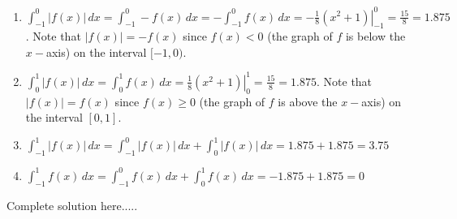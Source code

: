 \begin{example}
    \begin{sol}
    \renewcommand{\labelenumi}{\textbf{(\alph{enumi})}}
    \begin{enumerate}[leftmargin=*]
        \item $\displaystyle\int_{-1}^0 \bm{|}f(x)\bm{|}\,dx=\int_{-1}^0 -f(x)\,dx=-\int_{-1}^0 f(x)\,dx=\left.-\frac{1}{8}(x^2+1)\right|_{-1}^{0}= \frac{15}{8}=1.875$. Note that $\left|f(x)\right|=-f(x)$ since $f(x)< 0$ (the graph of $f$ is below the $x-$axis) on the interval $[-1,0)$.
        \item $\displaystyle\int_0^1 \bm{|}f(x)\bm{|}\,dx=\int_0^1 f(x)\,dx=\left.\frac{1}{8}(x^2+1)\right|_0^1= \frac{15}{8}=1.875$. Note that $\left|f(x)\right|=f(x)$ since $f(x)\ge 0$ (the graph of $f$ is above the $x-$axis) on the interval $[0,1]$.
        \item $\displaystyle\int_{-1}^1 \bm{|}f(x)\bm{|}\,dx=\int_{-1}^0 \bm{|}f(x)\bm{|}\,dx+\int_0^1 \bm{|}f(x)\bm{|}\,dx=1.875+1.875=3.75$
        \item $\displaystyle\int_{-1}^1 f(x)\,dx=\int_{-1}^0 f(x)\,dx+\int_0^1 f(x)\,dx=-1.875+1.875=0$
    \end{enumerate}
    \end{sol}
    \begin{solL}
    Complete solution here.....
    
    \end{solL}
\end{example}
\newpage
